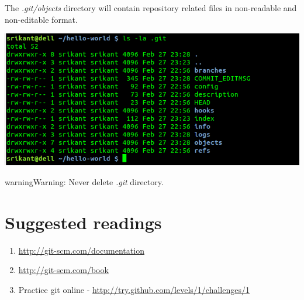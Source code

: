 \documentclass[letterpaper,10pt,english]{sphinxmanual}
\begin{document}
The \emph{.git/objects} directory will contain repository related files in
non-readable and non-editable format.

\includegraphics[width=1.000\linewidth]{ls-la-git.png}

\begin{notice}{warning}{Warning:}
Never delete \emph{.git} directory.
\end{notice}


\chapter{Suggested readings}
\label{version-control:suggested-readings}\begin{enumerate}
\item {} 
\href{http://git-scm.com/documentation}{http://git-scm.com/documentation}

\item {} 
\href{http://git-scm.com/book}{http://git-scm.com/book}

\item {} 
Practice git online - \href{http://try.github.com/levels/1/challenges/1}{http://try.github.com/levels/1/challenges/1}

\end{enumerate}



\renewcommand{\indexname}{Index}
\printindex
\end{document}
